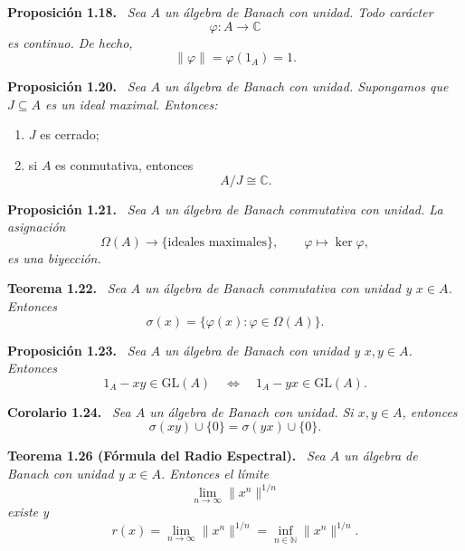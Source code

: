 \documentclass[11pt]{article}
\newcommand{\GL}{\mathrm{GL}}
\newenvironment{teorema}[1]
  {\par\medskip\noindent\textbf{Teorema #1.}\ \itshape}
  {\par\medskip}
\newenvironment{proposicion}[1]
  {\par\medskip\noindent\textbf{Proposición #1.}\ \itshape}
  {\par\medskip}
\newenvironment{corolario}[1]
  {\par\medskip\noindent\textbf{Corolario #1.}\ \itshape}
  {\par\medskip}
\begin{document}
\begin{proposicion}{1.18}
Sea $A$ un álgebra de Banach con unidad. Todo carácter
\[
  \varphi:A\to\mathbb{C}
\]
es continuo. De hecho,
\[
  \lVert\varphi\rVert=\varphi(1_A)=1.
\]
\end{proposicion}

\begin{proposicion}{1.20}
Sea $A$ un álgebra de Banach con unidad. Supongamos que $J\subseteq A$ es un ideal maximal. Entonces:
\begin{enumerate}[label=(\alph*),leftmargin=2.2em]
  \item $J$ es cerrado;
  \item si $A$ es conmutativa, entonces
  \[
    A/J\cong\mathbb{C}.
  \]
\end{enumerate}
\end{proposicion}

\begin{proposicion}{1.21}
Sea $A$ un álgebra de Banach conmutativa con unidad. La asignación
\[
  \Omega(A)\longrightarrow\{\text{ideales maximales}\},
  \qquad
  \varphi\longmapsto\ker\varphi,
\]
es una biyección.
\end{proposicion}

\begin{teorema}{1.22}
Sea $A$ un álgebra de Banach conmutativa con unidad y $x\in A$. Entonces
\[
  \sigma(x)=\{\varphi(x):\varphi\in\Omega(A)\}.
\]
\end{teorema}

\begin{proposicion}{1.23}
Sea $A$ un álgebra de Banach con unidad y $x,y\in A$. Entonces
\[
  1_A-xy\in\GL(A)
  \quad\Longleftrightarrow\quad
  1_A-yx\in\GL(A).
\]
\end{proposicion}

\begin{corolario}{1.24}
Sea $A$ un álgebra de Banach con unidad. Si $x,y\in A$, entonces
\[
  \sigma(xy)\cup\{0\}
  =
  \sigma(yx)\cup\{0\}.
\]
\end{corolario}

\begin{teorema}{1.26 (Fórmula del Radio Espectral)}
Sea $A$ un álgebra de Banach con unidad y $x\in A$. Entonces el límite
\[
  \lim_{n\to\infty}\lVert x^n\rVert^{1/n}
\]
existe y
\[
  r(x)
  =\lim_{n\to\infty}\lVert x^n\rVert^{1/n}
  =\inf_{n\in\mathbb{N}}\lVert x^n\rVert^{1/n}.
\]
\end{teorema}
\end{document}

